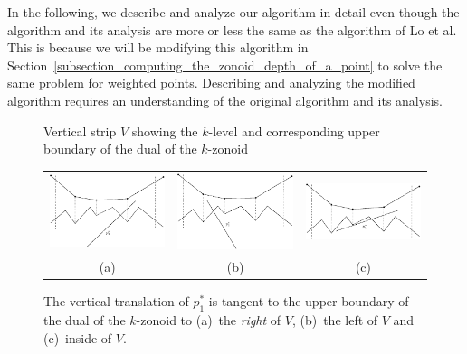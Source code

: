 \documentclass{elsart}
\begin{document}
In the following, we describe and analyze our algorithm in detail even
though the algorithm and its analysis are more or less the same as the
algorithm of Lo et al.  This is because we will be modifying this
algorithm in
Section~\ref{subsection_computing_the_zonoid_depth_of_a_point} to
solve the same problem for weighted points.  Describing and analyzing
the modified algorithm requires an understanding of the original
algorithm and its analysis.

\begin{figure}
 \begin{center} 
   \caption{\label{fig_vertical_strip}Vertical strip $V$ showing the $k$-level and corresponding upper boundary of the dual of the $k$-zonoid}
 \end{center}
\end{figure}

\begin{figure}
 \begin{center}
   \begin{center}\begin{tabular}{ccc} 
   \includegraphics[width=1.8in]{figs/fig5a} &
   \includegraphics[width=1.8in]{figs/fig5b} &
   \includegraphics[width=1.8in]{figs/fig5c} \\
   (a) & (b) & (c)
   \end{tabular}\end{center}
   \caption{\label{fig_vertical_strip_abc} The vertical translation of $p_1^*$ is tangent to the
upper boundary of the dual of the $k$-zonoid to (a)~the \emph{right}
of $V$, (b)~the left of $V$ and (c)~inside of $V$.}
 \end{center}
\end{figure}
\end{document}
